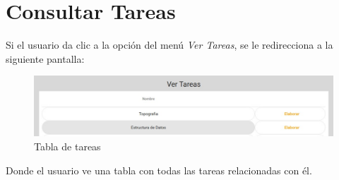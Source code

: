 
\section{Consultar Tareas}

    Si el usuario da clic a la opción del menú \textit{Ver Tareas}, se le redirecciona a la siguiente pantalla:
    \begin{figure}[H]
            \centering
            \hypertarget{asignart}{\includegraphics[width=0.7\linewidth]{images/Tareas/Vertareas}}
            \caption{Tabla de tareas}
            \label{asignart}
    \end{figure}
    Donde el usuario ve una tabla con todas las tareas relacionadas con él.